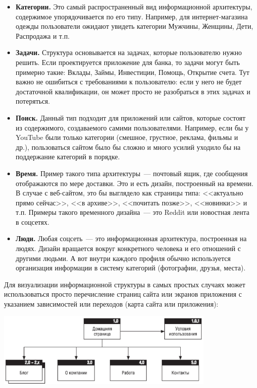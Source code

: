 \documentclass{../../text-style}
\begin{document}
\begin{itemize}
    \item \textbf{Категории.} Это самый распространенный вид информационной архитектуры, содержимое упорядочивается по его типу. Например, для интернет-магазина одежды пользователи ожидают увидеть категории Мужчины, Женщины, Дети, Распродажа и т.п.
    \item \textbf{Задачи.} Структура основывается на задачах, которые пользователю нужно решить. Если проектируется приложение для банка, то задачи могут быть примерно такие: Вклады, Займы, Инвестиции, Помощь, Открытие счета. Тут важно не ошибиться с требованиями к пользователю: если у него не будет достаточной квалификации, он может просто не разобраться в этих задачах и потеряться.
    \item \textbf{Поиск.} Данный тип подходит для приложений или сайтов, которые состоят из содержимого, создаваемого самими пользователями. Например, если бы у YouTube были только категории (смешное, грустное, реклама, фильмы и др.), пользоваться сайтом было бы сложно и много усилий уходило бы на поддержание категорий в порядке.
    \item \textbf{Время.} Пример такого типа архитектуры~--- почтовый ящик, где сообщения отображаются по мере доставки. Это и есть дизайн, построенный на времени. В случае с веб-сайтом, это бы выглядело как страницы типа: <<актуально прямо сейчас>>, <<в архиве>>, <<почитать позже>>, <<новинки>> и т.п. Примеры такого временного дизайна~--- это Reddit или новостная лента в соцсетях.
    \item \textbf{Люди.} Любая соцсеть~--- это информационная архитектура, построенная на людях. Дизайн вращается вокруг конкретного человека и его отношений с другими людьми. А вот внутри каждого профиля обычно используется организация информации в систему категорий (фотографии, друзья, места).
\end{itemize}

Для визуализации информационной структуры в самых простых случаях может использоваться просто перечисление страниц сайта или экранов приложения с указанием зависимостей или переходов (карта сайта или приложения):

\begin{center}
    \includegraphics[width=0.8\textwidth]{informationStructureSmall.png}
\end{center}
\end{document}
